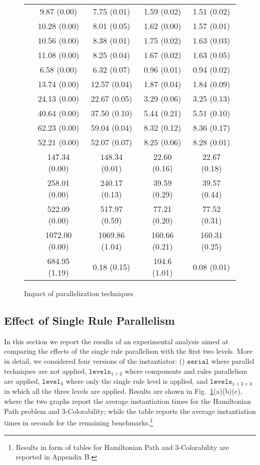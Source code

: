 \documentclass[preprint]{tlp}
\newcommand{\serial}{\ensuremath{\mathtt{serial}}\xspace}
\newcommand{\kali}{\ensuremath{\mathtt{levels_{1\!+\!2}}}\xspace}
\newcommand{\splitonly}{\ensuremath{\mathtt{level_3}}\xspace}
\newcommand{\paral}{\ensuremath{\mathtt{levels_{1\!+\!2\!+\!3}}}\xspace}
\begin{document}
\begin{figure}[t!]
{\begin{tabular}{| c | c | c | c | c |}
 & 9.87 (0.00) & 7.75 (0.01) & 1.59 (0.02) & 1.51 (0.02)\\
 & 10.28 (0.00) & 8.01 (0.05) & 1.62 (0.00) & 1.57 (0.01)\\
 & 10.56 (0.00) & 8.38 (0.01) & 1.75 (0.02) & 1.63 (0.03)\\
 & 11.08 (0.00) & 8.25 (0.04) & 1.67 (0.02) & 1.63 (0.05)\\
\cline{1-5}
 & 6.58 (0.00) & 6.32 (0.07) & 0.96 (0.01) & 0.94 (0.02)\\
 & 13.74 (0.00) & 12.57 (0.04) & 1.87 (0.04) & 1.84 (0.09)\\
 & 24.13 (0.00) & 22.67 (0.05) & 3.29 (0.06) & 3.25 (0.13)\\
 & 40.64 (0.00) & 37.50 (0.10) & 5.44 (0.21) & 5.51 (0.10)\\
 & 62.23 (0.00) & 59.04 (0.04) & 8.32 (0.12) & 8.36 (0.17)\\
\cline{1-5}
 & 52.21 (0.00) & 52.07 (0.07) & 8.25 (0.06) & 8.28 (0.01) \\
 & 147.34 (0.00) & 148.34 (0.01) & 22.60 (0.16) & 22.67 (0.18) \\
 & 258.01 (0.00) & 240.17 (0.13) & 39.59 (0.29) & 39.57 (0.44) \\
 & 522.09 (0.00) & 517.97 (0.59) & 77.21 (0.20) & 77.52 (0.31) \\
 & 1072.00 (0.00) & 1069.86 (1.04) & 160.66 (0.21) & 160.31 (0.25) \\
\cline{1-5}
& 684.95 (1.19)  & 0.18 (0.15) & 104.6 (1.01) & 0.08 (0.01) \\
\cline{1-5}
\end{tabular}
 \label{tab:tec}
}
\centering
{}
\hspace{0.0cm}
\hspace{5mm}
\caption{Impact of parallelization techniques} \label{tab:technique}
\end{figure}


\subsection{Effect of Single Rule Parallelism}

In this section we report the results of an experimental analysis aimed at comparing the effects
of the single rule parallelism with the first two levels.
More in detail, we considered four versions of the instantiator: () \serial where parallel techniques are not applied,
 \kali where components and rules parallelism are applied,
 \splitonly where only the single rule level is applied, and
 \paral in which all the three levels are applied.
Results are shown in Fig.~\ref{tab:technique}(a)(b)(c), where the two graphs report
the average instantiation times for the Hamiltonian Path problem and 3-Colorability; while the table reports
the average instantiation times in seconds for the remaining benchmarks.\footnote{Results in form of tables for Hamiltonian Path and 3-Colorability are reported in Appendix B.}
\end{document}
